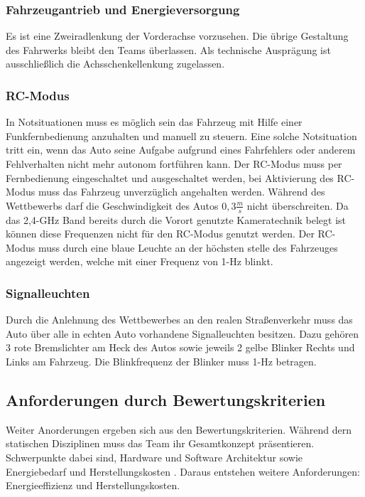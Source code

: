 \subsubsection{Fahrzeugantrieb und Energieversorgung}
Es ist eine Zweiradlenkung der Vorderachse vorzusehen. Die übrige Gestaltung des Fahrwerks bleibt den Teams überlassen. Als
technische Ausprägung ist ausschließlich die Achsschenkellenkung zugelassen.

\subsubsection{RC-Modus}
In Notsituationen muss es möglich sein das Fahrzeug mit Hilfe einer Funkfernbedienung anzuhalten und manuell zu steuern. Eine solche Notsituation tritt ein, wenn
das Auto seine Aufgabe aufgrund eines Fahrfehlers oder anderem Fehlverhalten nicht mehr autonom fortführen kann.
Der RC-Modus muss per Fernbedienung eingeschaltet und ausgeschaltet werden, bei Aktivierung des RC-Modus muss das Fahrzeug unverzüglich angehalten werden.
Während des Wettbewerbs darf die Geschwindigkeit des Autos $0,3\frac{m}{s}$ nicht überschreiten.
Da das 2,4-GHz Band bereits durch die Vorort genutzte Kameratechnik belegt ist können diese Frequenzen nicht für den RC-Modus genutzt werden.
Der RC-Modus muss durch eine blaue Leuchte an der höchsten stelle des Fahrzeuges angezeigt werden, welche mit einer Frequenz von 1-Hz blinkt.

\subsubsection{Signalleuchten}
Durch die Anlehnung des Wettbewerbes an den realen Straßenverkehr muss das Auto über alle in echten Auto vorhandene Signalleuchten besitzen. 
Dazu gehören 3 rote Bremslichter am Heck des Autos sowie jeweils 2 gelbe Blinker Rechts und Links am Fahrzeug.  Die Blinkfrequenz der Blinker muss
1-Hz betragen.

\subsection{Anforderungen durch Bewertungskriterien}
Weiter Anorderungen ergeben sich aus den Bewertungskriterien. Während dern statischen Disziplinen muss das Team ihr Gesamtkonzept präsentieren. Schwerpunkte dabei sind,
Hardware und Software Architektur sowie Energiebedarf und Herstellungskosten \cite{website-carolo-cup-regelwerk}. Daraus entstehen weitere Anforderungen: Energieeffizienz
und Herstellungskosten. 

